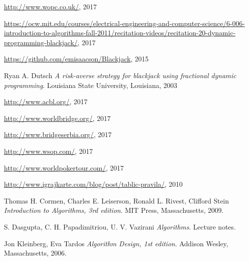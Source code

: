 \documentclass[a4paper, 12pt, ngerman]{article}
\begin{document}

\pagebreak


\pagebreak


\pagebreak


\pagebreak


\pagebreak

\begin{thebibliography}{100}

\url{http://www.wopc.co.uk/}, 2017

\url{https://ocw.mit.edu/courses/electrical-engineering-and-computer-science/6-006-introduction-to-algorithms-fall-2011/recitation-videos/recitation-20-dynamic-programming-blackjack/}, 2017

\url{https://github.com/emisaacson/Blackjack}, 2015

Ryan A. Dutsch
\textit{A risk-averse strategy for blackjack using fractional dynamic programming}.
Louisiana State University, Louisiana, 2003

\url{http://www.acbl.org/}, 2017

\url{http://www.worldbridge.org/}, 2017

\url{http://www.bridgeserbia.org/}, 2017

\url{http://www.wsop.com/}, 2017

\url{http://www.worldpokertour.com/}, 2017

\url{http://www.igrajkarte.com/blog/post/tablic-pravila/}, 2010

Thomas H. Cormen, Charles E. Leiserson, Ronald L. Rivest, Clifford Stein
\textit{Introduction to Algorithms, 3rd edition}.
MIT Press, Massachusetts, 2009.

S. Dasgupta, C. H. Papadimitriou, U. V. Vazirani
\textit{Algorithms}.
Lecture notes.

Jon Kleinberg, Eva Tardos
\textit{Algorithm Design, 1st edition}.
Addison Wesley, Massachusetts, 2006.


\end{thebibliography}
\end{document}
